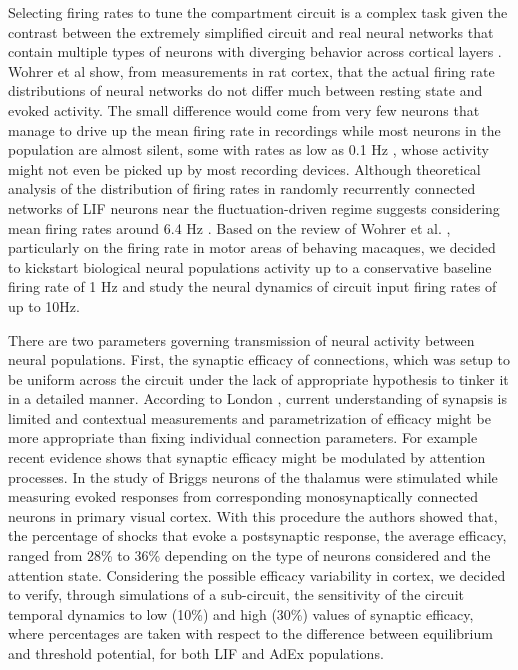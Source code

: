 \documentclass[10pt]{article}
\begin{document}
Selecting firing rates to tune the compartment circuit is a complex task given the contrast between the extremely simplified circuit and real neural networks that contain multiple types of neurons with diverging behavior across cortical layers \cite{Wohrer_2013}.
Wohrer et al \cite{Wohrer_2013} show, from measurements in rat cortex, that the actual firing rate distributions of neural networks do not differ much between resting state and evoked activity.
The small difference would come from very few neurons that manage to drive up the mean firing rate in recordings while most neurons in the population are almost silent, some with rates as low as 0.1 Hz \cite{Kerr_2005}, whose activity might not even be picked up by most recording devices.
Although theoretical analysis of the distribution of firing rates in randomly recurrently connected networks of LIF neurons near the fluctuation-driven regime suggests considering mean firing rates around 6.4 Hz \cite{Roxin_2011}.
Based on the review of Wohrer et al. \cite{Wohrer_2013}, particularly on the firing rate in motor areas of behaving macaques, we decided to kickstart biological neural populations activity up to a conservative baseline firing rate of 1 Hz and study the neural dynamics of circuit input firing rates of up to 10Hz.

There are two parameters governing transmission of neural activity between neural populations.
First, the synaptic efficacy of connections, which was setup to be uniform across the circuit under the lack of appropriate hypothesis to tinker it in a detailed manner. According to London \cite{London_2002}, current understanding of synapsis is limited and contextual measurements and parametrization of efficacy might be more appropriate than fixing individual connection parameters.
For example recent evidence \cite{Briggs_2013} shows that synaptic efficacy might be modulated by attention processes.
In the study of Briggs \cite{Briggs_2013} neurons of the thalamus were stimulated while measuring evoked responses from corresponding monosynaptically connected neurons in primary visual cortex.
With this procedure the authors showed that, the percentage of shocks that evoke a postsynaptic response, the average efficacy, ranged from 28\% to 36\% depending on the type of neurons considered and the attention state.
Considering the possible efficacy variability in cortex, we decided to verify, through simulations of a sub-circuit, the sensitivity of the circuit temporal dynamics to low (10\%) and high (30\%) values of synaptic efficacy, where percentages are taken with respect to the difference between equilibrium and threshold potential, for both LIF and AdEx populations.
\end{document}
